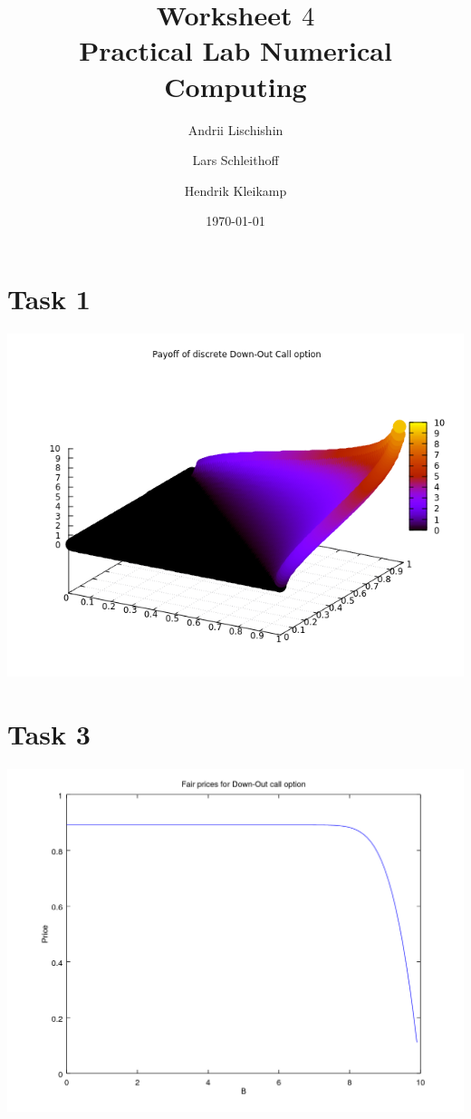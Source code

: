 \documentclass[10pt,a4paper]{article}
\begin{document}
\title{Worksheet $4$\\
\small{Practical Lab Numerical Computing}}
\author{Andrii Lischishin \and Lars Schleithoff \and Hendrik Kleikamp}
\date{\today}
\maketitle

\section*{Task 1}

\begin{center}
	\includegraphics[scale=0.5]{payoff_down_out_call.png}
\end{center}

\section*{Task 3}

\begin{center}
	\includegraphics[scale=0.5]{fair_prices_down_out_call.png}
\end{center}
\end{document}
